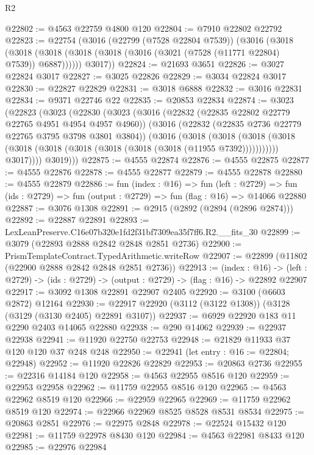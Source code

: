 \begin{lexlean}{R2}
\begin{coremodule}
@22802 := @4563 @22759 @4800 @120
@22804 := @7910 @22802 @22792
@22823 := @22754
    (@3016
      (@22799 (@7528 @22804 @7539))
      (@3016
        (@3018 (@3018 (@3018 (@3018 (@3018 (@3016 (@3021 (@7528 (@11771 @22804) @7539)) @6887))))))
        @3017))
@22824 := @21693 @3651
@22826 := @3027 @22824 @3017
@22827 := @3025 @22826
@22829 := @3034 @22824 @3017
@22830 := @22827 @22829
@22831 := @3018 @6888
@22832 := @3016 @22831
@22834 := @9371 @22746 @22
@22835 := @20853 @22834
@22874 := @3023
    (@22823
      (@3023
        (@22830
          (@3023
            (@3016
              (@22832 (@22835 @22802 @22779 @22765 @4951 @4954 @4957 @4960))
              (@3016
                (@22832 (@22835 @2736 @22779 @22765 @3795 @3798 @3801 @3804))
                (@3016
                  (@3018
                    (@3018
                      (@3018
                        (@3018 (@3018 (@3018 (@3018 (@3018 (@3018 (@3018 (@11955 @7392)))))))))))
                  @3017))))
          @3019)))
@22875 := @4555 @22874
@22876 := @4555 @22875
@22877 := @4555 @22876
@22878 := @4555 @22877
@22879 := @4555 @22878
@22880 := @4555 @22879
@22886 := fun (index : @16) =>
  fun (left : @2729) =>
  fun (ids : @2729) => fun (output : @2729) => fun (flag : @16) => @14066 @22880
@22887 := @3076 @1308
@22891 := @2915 (@2892 (@2894 (@2896 @2874)))
@22892 := @22887 @22891
@22893 := LexLeanPreserve.C16e07b320e1fd2f31bf7309ea35f7ff6.R2.__fits_30
@22899 := @3079 (@22893 @2888 @2842 @2848 @2851 @2736)
@22900 := PrismTemplateContract.TypedArithmetic.writeRow
@22907 := @22899 (@11802 (@22900 @2888 @2842 @2848 @2851 @2736))
@22913 := (index : @16) ->
  (left : @2729) -> (ids : @2729) -> (output : @2729) -> (flag : @16) -> @22892 @22907
@22917 := @3092 @1308 @22891 @22907 @2405
@22920 := @3100 (@6603 @2872) @12164
@22930 := @22917 @22920 (@3112 (@3122 @1308)) (@3128 (@3129 (@3130 @2405) @22891 @3107))
@22937 := @6929 @22920 @183 @11 @2290 @2403 @14065 @22880
@22938 := @290 @14062
@22939 := @22937 @22938
@22941 := @11920 @22750 @22753
@22948 := @21829 @11933 @37 @120 @120 @37 @248 @248
@22950 := @22941 (let entry : @16 := @22804; @22948)
@22952 := @11920 @22826 @22829
@22953 := @20863 @2736
@22955 := @22316 @14184 @120
@22958 := @4563 @22955 @8516 @120
@22959 := @22953 @22958
@22962 := @11759 @22955 @8516 @120
@22965 := @4563 @22962 @8519 @120
@22966 := @22959 @22965
@22969 := @11759 @22962 @8519 @120
@22974 := @22966 @22969 @8525 @8528 @8531 @8534
@22975 := @20863 @2851
@22976 := @22975 @2848
@22978 := @22524 @15432 @120
@22981 := @11759 @22978 @8430 @120
@22984 := @4563 @22981 @8433 @120
@22985 := @22976 @22984

\end{coremodule}
\end{lexlean}
